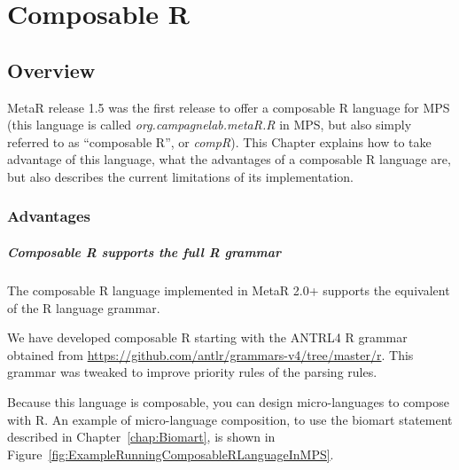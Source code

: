 


\chapter{Composable R}\label{chap:ComposableR}
\section{Overview}
MetaR release 1.5 was the first release to offer a composable R language for MPS (this language is called \textit{org.campagnelab.metaR.R} in MPS, but also simply referred to as ``composable R'', or \textit{compR}). This Chapter explains how to take advantage of this language, what the advantages of a composable R language are, but also describes the current limitations of its implementation.

\subsection{Advantages}
\paragraph{Composable R supports the full R grammar}

The composable R language implemented in MetaR 2.0+ supports  the equivalent of the R language grammar. 
\begin{remark}
We have developed composable R starting with the ANTRL4 R grammar obtained from \url{https://github.com/antlr/grammars-v4/tree/master/r}. This grammar was tweaked to improve priority rules of the parsing rules.
\end{remark}
Because this language is composable, you can design micro-languages to compose with R. An example of micro-language composition, to use the biomart statement described in Chapter~\ref{chap:Biomart}, is shown in Figure~\ref{fig:ExampleRunningComposableRLanguageInMPS}.


